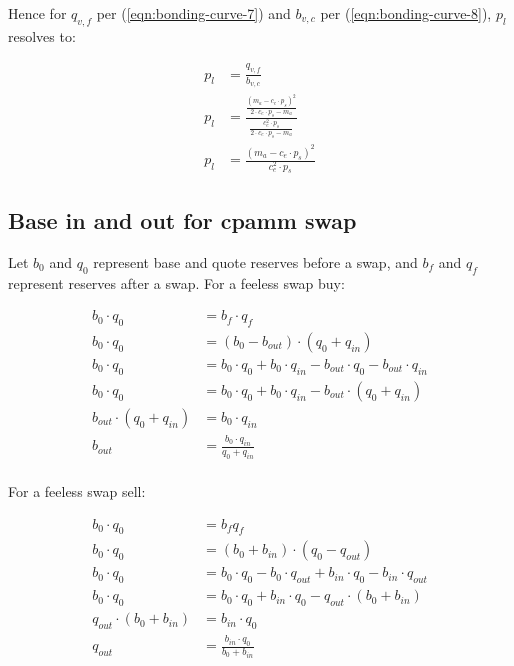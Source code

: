 \documentclass[table, twocolumn]{article}
\begin{document}
Hence for $q_{v, f}$ per (\ref{eqn:bonding-curve-7}) and $b_{v, c}$ per
(\ref{eqn:bonding-curve-8}), $p_l$ resolves to:

\begin{align}
  p_l & = \frac{q_{v, f}}{b_{v, c}} \nonumber                                  \\
  p_l & = \frac{\frac{(m_a - c_e \cdot p_s) ^ 2}{2 \cdot c_e \cdot p_s - m_a}}
  {\frac{c_e ^ 2 \cdot p_s}{2 \cdot c_e \cdot p_s - m_a}} \nonumber            \\
  p_l & = \frac{(m_a - c_e \cdot p_s) ^ 2}{c_e ^ 2 \cdot p_s}
\end{align}

\subsection{Base in and out for \gls*{cpamm} swap} \label{eqn:b-q-out-simple-derivation}

Let $b_0$ and $q_0$ represent base and quote reserves before a swap, and $b_f$ and $q_f$
represent reserves after a swap. For a feeless swap buy:

\begin{align}
  b_0 \cdot q_0                & = b_f \cdot q_f \nonumber                         \\
  b_0 \cdot q_0                & = (b_0 - b_{out}) \cdot (q_0 + q_{in}) \nonumber  \\
  b_0 \cdot q_0                & = b_0 \cdot q_0 + b_0 \cdot q_{in} - b_{out}
  \cdot q_0 - b_{out} \cdot q_{in} \nonumber                                       \\
  b_0 \cdot q_0                & = b_0 \cdot q_0 + b_0 \cdot q_{in} -
  b_{out} \cdot (q_0 + q_{in}) \nonumber                                           \\
  b_{out} \cdot (q_0 + q_{in}) & = b_0 \cdot q_{in} \nonumber                      \\
  b_{out}                      & = \frac{b_0 \cdot q_{in}}{q_0 + q_{in}} \nonumber \\
\end{align}

For a feeless swap sell:

\begin{align}
  b_0 \cdot q_0               & = b_f q_f \nonumber                               \\
  b_0 \cdot q_0               & = (b_0 + b_{in}) \cdot (q_0 - q_{out}) \nonumber  \\
  b_0 \cdot q_0               & = b_0 \cdot q_0 - b_0 \cdot q_{out} +
  b_{in} \cdot q_0 - b_{in} \cdot q_{out} \nonumber                               \\
  b_0 \cdot q_0               & = b_0 \cdot q_0 + b_{in} \cdot q_0 -
  q_{out} \cdot(b_0 + b_{in}) \nonumber                                           \\
  q_{out} \cdot(b_0 + b_{in}) & = b_{in} \cdot q_0 \nonumber                      \\
  q_{out}                     & = \frac{b_{in} \cdot q_0}{b_0 + b_{in}} \nonumber \\
\end{align}
\end{document}
